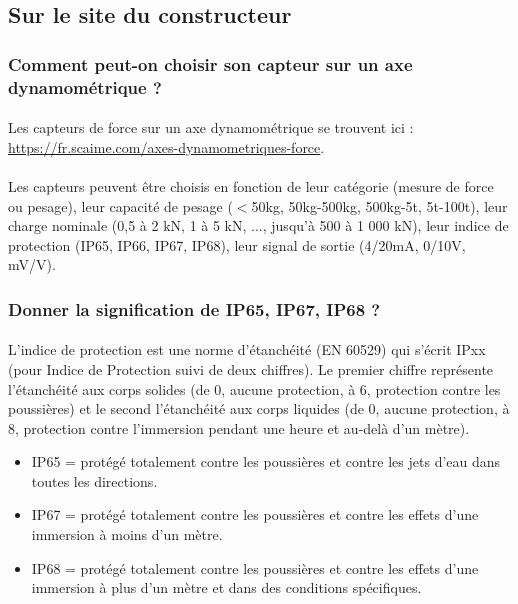 \documentclass{article}
\begin{document}
\subsection{Sur le site du constructeur}
\subsubsection{Comment peut-on choisir son capteur sur un axe dynamométrique ?}
\paragraph{}
Les capteurs de force sur un axe dynamométrique se trouvent ici :\\
\url{https://fr.scaime.com/axes-dynamometriques-force}.

\paragraph{}
Les capteurs peuvent être choisis en fonction de leur catégorie (mesure de force ou pesage), leur capacité de pesage ($<$50kg, 50kg-500kg, 500kg-5t, 5t-100t), leur charge nominale (0,5 à 2 kN, 1 à 5 kN, ..., jusqu'à 500 à 1 000 kN), leur indice de protection (IP65, IP66, IP67, IP68), leur signal de sortie (4/20mA, 0/10V, mV/V).

\subsubsection{Donner la signification de IP65, IP67, IP68 ?}
\paragraph{}
L'indice de protection est une norme d'étanchéité (EN 60529) qui s'écrit IPxx (pour Indice de Protection suivi de deux chiffres). Le premier chiffre représente l'étanchéité aux corps solides (de 0, aucune protection, à 6, protection contre les poussières) et le second l'étanchéité aux corps liquides (de 0, aucune protection, à 8, protection contre l'immersion pendant une heure et au-delà d'un mètre).

\begin{itemize}
    \item IP65 = protégé totalement contre les poussières et contre les jets d'eau dans toutes les directions.
    \item IP67 = protégé totalement contre les poussières et contre les effets d'une immersion à moins d'un mètre.
    \item IP68 = protégé totalement contre les poussières et contre les effets d'une immersion à plus d'un mètre et dans des conditions spécifiques.
\end{itemize}
\end{document}
